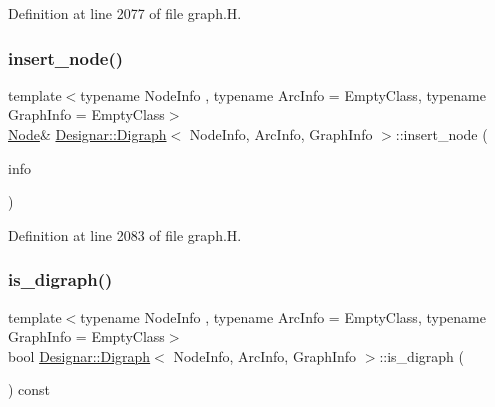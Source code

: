 Definition at line 2077 of file graph.\+H.

\mbox{\label{class_designar_1_1_digraph_a6b099922c3891b2c9fce75ffeedba025}} 
\subsubsection{\texorpdfstring{insert\+\_\+node()}{insert\_node()}\hspace{0.1cm}{\footnotesize\ttfamily [4/4]}}
{\footnotesize\ttfamily template$<$typename Node\+Info , typename Arc\+Info  = Empty\+Class, typename Graph\+Info  = Empty\+Class$>$ \\
\hyperlink{class_designar_1_1_digraph_a4dc921c41a480b7946a04170e997d8ae}{Node}\& \hyperlink{class_designar_1_1_digraph}{Designar\+::\+Digraph}$<$ Node\+Info, Arc\+Info, Graph\+Info $>$\+::insert\+\_\+node (\begin{DoxyParamCaption}\item[{Node\+Info \&\&}]{info }\end{DoxyParamCaption})\hspace{0.3cm}{\ttfamily [inline]}}



Definition at line 2083 of file graph.\+H.

\mbox{\label{class_designar_1_1_digraph_a6751952e13a35cf7aa452a8bb243f53d}} 
\subsubsection{\texorpdfstring{is\+\_\+digraph()}{is\_digraph()}}
{\footnotesize\ttfamily template$<$typename Node\+Info , typename Arc\+Info  = Empty\+Class, typename Graph\+Info  = Empty\+Class$>$ \\
bool \hyperlink{class_designar_1_1_digraph}{Designar\+::\+Digraph}$<$ Node\+Info, Arc\+Info, Graph\+Info $>$\+::is\+\_\+digraph (\begin{DoxyParamCaption}{ }\end{DoxyParamCaption}) const\hspace{0.3cm}{\ttfamily [inline]}}



